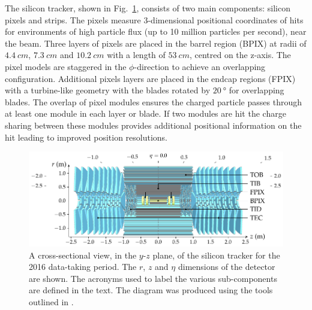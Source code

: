 The silicon tracker, shown in Fig.~\ref{fig:cms-tracker}, consists of two main
components: silicon pixels and strips. The pixels measure 3-dimensional positional
coordinates of hits for environments of high particle flux (up to 10 million
particles per second), near the beam. Three layers of pixels are placed in the
barrel region (BPIX) at radii of ${\SI{4.4}{cm}}$, ${\SI{7.3}{cm}}$ and 
${\SI{10.2}{cm}}$ with a length of ${\SI{53}{cm}}$, centred on the z-axis. The pixel
models are staggered in the $\phi$-direction to achieve an overlapping
configuration. Additional pixels layers are placed in the endcap regions (FPIX) with
a turbine-like geometry with the blades rotated by ${\SI{20}{\degree}}$ for
overlapping blades. The overlap of pixel modules ensures the charged particle passes
through at least one module in each layer or blade. If two modules are hit the
charge sharing between these modules provides additional positional information on
the hit leading to improved position resolutions.

\begin{figure}[htbp]
    \centering
    \includegraphics[]{diagrams/tikz/cms/annotated/cms_tracker.pdf}
    \caption{
        A cross-sectional view, in the $y$-$z$ plane, of the silicon tracker for the
        2016 data-taking period. The $r$, $z$ and $\eta$ dimensions of the detector 
        are shown. The acronyms used to label the various sub-components are defined
        in the text. The diagram was produced using the tools outlined in
        \cite{Sakuma:2013jqa}.
    }
    \label{fig:cms-tracker}
\end{figure}

